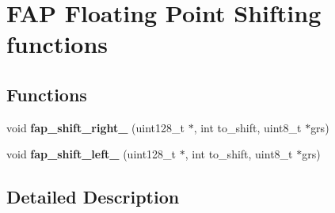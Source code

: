 \hypertarget{group__FAP__FP__SHIFTING__FUNCTIONS}{}\section{F\+AP Floating Point Shifting functions}
\label{group__FAP__FP__SHIFTING__FUNCTIONS}
\subsection*{Functions}
\begin{DoxyCompactItemize}
\item 
\hypertarget{group__FAP__FP__SHIFTING__FUNCTIONS_ga0ed6cc29d7fb322732e4def6f3e227ee}{}\label{group__FAP__FP__SHIFTING__FUNCTIONS_ga0ed6cc29d7fb322732e4def6f3e227ee} 
void {\bfseries fap\+\_\+shift\+\_\+right\+\_\+} (uint128\+\_\+t $\ast$, int to\+\_\+shift, uint8\+\_\+t $\ast$grs)
\item 
\hypertarget{group__FAP__FP__SHIFTING__FUNCTIONS_ga5fb1f3adac7181da3245ba307dcd1c93}{}\label{group__FAP__FP__SHIFTING__FUNCTIONS_ga5fb1f3adac7181da3245ba307dcd1c93} 
void {\bfseries fap\+\_\+shift\+\_\+left\+\_\+} (uint128\+\_\+t $\ast$, int to\+\_\+shift, uint8\+\_\+t $\ast$grs)
\end{DoxyCompactItemize}


\subsection{Detailed Description}
